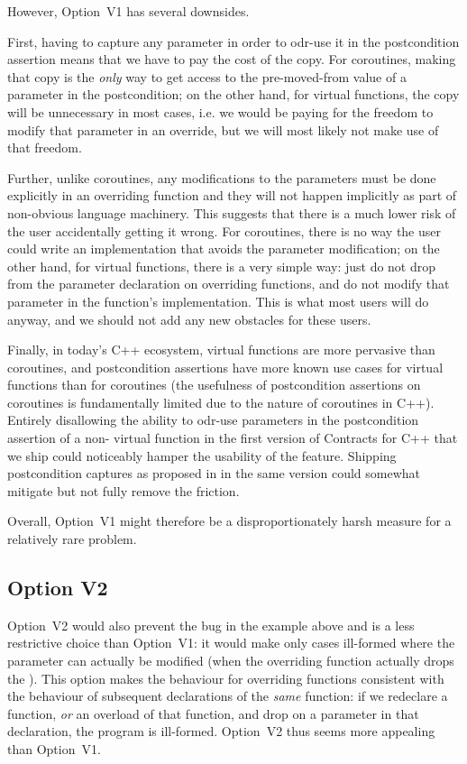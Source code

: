 However, Option~V1 has several downsides.

First, having to capture any parameter in order to odr-use it in the postcondition assertion means that we have to pay the cost of the copy. For coroutines, making that copy is the \emph{only} way to get access to the pre-moved-from value of a parameter in the postcondition; on the other hand, for virtual functions, the copy will be unnecessary in most cases, i.e. we would be paying for the freedom to modify that parameter in an override, but we will most likely not make use of that freedom.

Further, unlike coroutines, any modifications to the parameters must be done explicitly in an overriding function and they will not happen implicitly as part of non-obvious language machinery. This suggests that there is a much lower risk of the user accidentally getting it wrong. For coroutines, there is no way the user could write an implementation that avoids the parameter modification; on the other hand, for virtual functions, there is a very simple way: just do not drop  from the parameter declaration on overriding functions, and do not modify that parameter in the function's implementation. This is what most users will do anyway, and we should not add any new obstacles for these users.

Finally, in today's C++ ecosystem, virtual functions are more pervasive than coroutines, and postcondition assertions have more known use cases for virtual functions than for coroutines (the usefulness of postcondition assertions on coroutines is fundamentally limited due to the nature of coroutines in C++). Entirely disallowing the ability to odr-use parameters in the postcondition assertion of a non- virtual function in the first version of Contracts for C++ that we ship could noticeably hamper the usability of the feature. Shipping postcondition captures as proposed in \cite{P3098R0} in the same version could somewhat mitigate but not fully remove the friction.

Overall, Option~V1 might therefore be a disproportionately harsh measure for a relatively rare problem.

\subsection*{Option V2}

Option~V2 would also prevent the bug in the example above and is a less restrictive choice than Option~V1: it would make only cases ill-formed where the parameter can actually be modified (when the overriding function actually drops the ). This option makes  the behaviour for overriding functions consistent with the behaviour of subsequent declarations of the \emph{same} function: if we redeclare a function, \emph{or} an overload of that function, and drop  on a parameter in that declaration, the program is ill-formed. Option~V2 thus seems more appealing than Option~V1.

